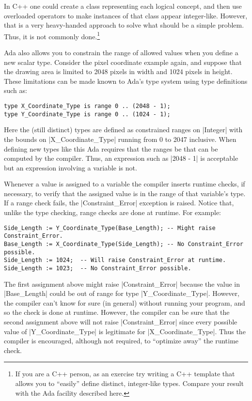 In C++ one could create a class representing each logical concept, and then use overloaded
operators to make instances of that class appear integer-like. However, that is a very
heavy-handed approach to solve what should be a simple problem. Thus, it is not commonly
done.\footnote{If you are a C++ person, as an exercise try writing a C++ template that allows
  you to ``easily'' define distinct, integer-like types. Compare your result with the Ada
  facility described here.}

Ada also allows you to constrain the range of allowed values when you define a new scalar type.
Consider the pixel coordinate example again, and suppose that the drawing area is limited to
2048 pixels in width and 1024 pixels in height. These limitations can be made known to Ada's
type system using type definitions such as:

\begin{lstlisting}
type X_Coordinate_Type is range 0 .. (2048 - 1);
type Y_Coordinate_Type is range 0 .. (1024 - 1);
\end{lstlisting}

Here the (still distinct) types are defined as constrained ranges on |Integer| with the bounds
on |X_Coordinate_Type| running from 0 to 2047 inclusive. When defining new types like this Ada
requires that the ranges be  that can be computed by the compiler.
Thus, an expression such as |2048 - 1| is acceptable but an expression involving a variable is
not.

Whenever a value is assigned to a variable the compiler inserts runtime checks, if necessary, to
verify that the assigned value is in the range of that variable's type. If a range check fails,
the |Constraint_Error| exception is raised. Notice that, unlike the type checking, range checks
are done at runtime. For example:

\begin{lstlisting}
Side_Length := Y_Coordinate_Type(Base_Length); -- Might raise Constraint_Error.
Base_Length := X_Coordinate_Type(Side_Length); -- No Constraint_Error possible.
Side_Length := 1024;  -- Will raise Constraint_Error at runtime.
Side_Length := 1023;  -- No Constraint_Error possible.
\end{lstlisting}

The first assignment above might raise |Constraint_Error| because the value in |Base_Length|
could be out of range for type |Y_Coordinate_Type|. However, the compiler can't know for sure
(in general) without running your program, and so the check is done at runtime. However, the
compiler can be sure that the second assignment above will not raise |Constraint_Error| since
every possible value of |Y_Coordinate_Type| is legitimate for |X_Coordinate_Type|. Thus the
compiler is encouraged, although not required, to ``optimize away'' the runtime check.

